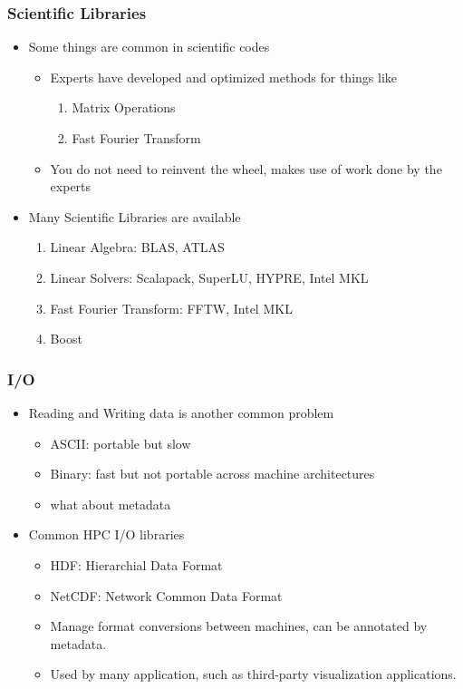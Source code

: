 \documentclass[slidestop,mathserif,compress,xcolor=svgnames,table]{beamer}
\begin{document}
\begin{frame}
  \frametitle{\small Scientific Libraries}
  \begin{itemize}
    \item Some things are common in scientific codes
    \begin{itemize}
      \item Experts have developed and optimized methods for things like
      \begin{enumerate}
        \item Matrix Operations
        \item Fast Fourier Transform
      \end{enumerate}
      \item You do not need to reinvent the wheel, makes use of work done by the experts
    \end{itemize}
    \item Many Scientific Libraries are available
    \begin{enumerate}
      \item Linear Algebra: BLAS, ATLAS
      \item Linear Solvers: Scalapack, SuperLU, HYPRE, Intel MKL
      \item Fast Fourier Transform: FFTW, Intel MKL
      \item Boost
    \end{enumerate}
  \end{itemize}
\end{frame}

\begin{frame}
  \frametitle{\small I/O}
  \begin{itemize}
    \item Reading and Writing data is another common problem
    \begin{itemize}
      \item ASCII: portable but slow
      \item Binary: fast but not portable across machine architectures
      \item what about metadata
    \end{itemize}
    \item Common HPC I/O libraries
    \begin{itemize}
      \item HDF: Hierarchial Data Format
      \item NetCDF: Network Common Data Format
      \item Manage format conversions between machines, can be annotated by metadata.
      \item Used by many application, such as third-party visualization applications.
    \end{itemize}
  \end{itemize}
\end{frame}
\end{document}
